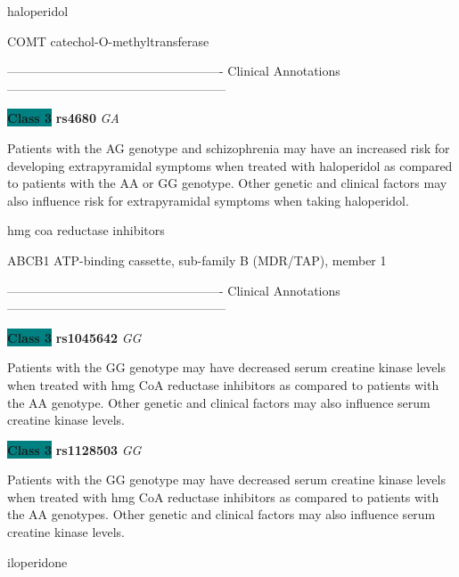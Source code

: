 \documentclass{resume} %
\begin{document}
\begin{rSection}{ haloperidol }
\begin{rSubsection}{ COMT }{ catechol-O-methyltransferase }{}{}
\item[] ---------------------------------------------------- Clinical Annotations -----------------------------------------------------\newline
\item \textbf{\colorbox{teal} {Class 3}} \textbf{ rs4680 } \textit{ GA }
\item[] Patients with the AG genotype and schizophrenia may have an increased risk for developing extrapyramidal symptoms when treated with haloperidol as compared to patients with the AA or GG genotype. Other genetic and clinical factors may also influence risk for extrapyramidal symptoms when taking haloperidol.
\end{rSubsection}

\end{rSection}\begin{rSection}{ hmg coa reductase inhibitors }
\item[]

\begin{rSubsection}{ ABCB1 }{ ATP-binding cassette, sub-family B (MDR/TAP), member 1 }{}{}
\item[]

\item[] ---------------------------------------------------- Clinical Annotations -----------------------------------------------------\newline
\item \textbf{\colorbox{teal} {Class 3}} \textbf{ rs1045642 } \textit{ GG }
\item[] Patients with the GG genotype may have decreased serum creatine kinase levels when treated with hmg CoA reductase inhibitors as compared to patients with the AA genotype. Other genetic and clinical factors may also influence serum creatine kinase levels. \item \textbf{\colorbox{teal} {Class 3}} \textbf{ rs1128503 } \textit{ GG }
\item[] Patients with the GG genotype may have decreased serum creatine kinase levels when treated with hmg CoA reductase inhibitors as compared to patients with the AA genotypes. Other genetic and clinical factors may also influence serum creatine kinase levels. 
\end{rSubsection}

\end{rSection}\begin{rSection}{ iloperidone }
\item[]


\end{rSection}
\end{document}
